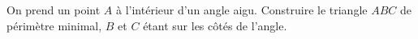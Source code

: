 On prend un point $A$ à l'intérieur d'un angle aigu. Construire le triangle $ABC$ de périmètre minimal, $B$ et $C$ étant sur les côtés de l'angle.
